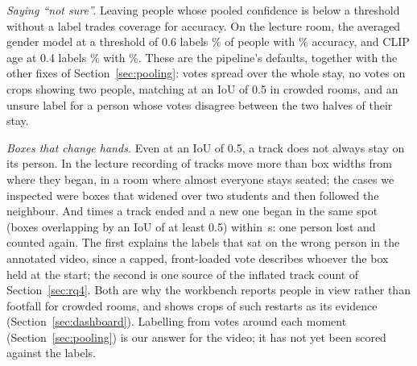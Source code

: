 \emph{Saying ``not sure''.} Leaving people whose pooled confidence is below a
threshold without a label trades coverage for accuracy. On the lecture room, the
averaged gender model at a threshold of 0.6 labels \%
of people with \% accuracy, and CLIP age at 0.4
labels \% with \%. These
are the pipeline's defaults, together with the other fixes of
Section~\ref{sec:pooling}: votes spread over the whole stay, no votes on crops
showing two people, matching at an IoU of 0.5 in crowded rooms, and an unsure
label for a person whose votes disagree between the two halves of their stay.

\emph{Boxes that change hands.} Even at an IoU of 0.5, a track does not always
stay on its person. In the lecture recording  of
 tracks move more than  box widths from
where they began, in a room where almost everyone stays seated; the cases we
inspected were boxes that widened over two students and then followed the
neighbour. And  times a track ended and a new one began in
the same spot (boxes overlapping by an IoU of at least 0.5) within
\,s: one person lost and counted again. The first explains the
labels that sat on the wrong person in the annotated video, since a capped,
front-loaded vote describes whoever the box held at the start; the second is
one source of the inflated track count of Section~\ref{sec:rq4}. Both are why
the workbench reports people in view rather than footfall for crowded rooms, and
shows crops of such restarts as its evidence (Section~\ref{sec:dashboard}).
Labelling from votes around each moment (Section~\ref{sec:pooling}) is our
answer for the video; it has not yet been scored against the labels.
